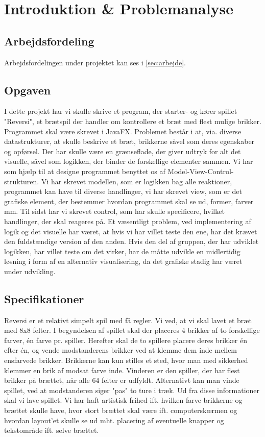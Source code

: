 \section{Introduktion \& Problemanalyse}
\subsection{Arbejdsfordeling}
Arbejdsfordelingen under projektet kan ses i \cref{sec:arbejde}.
\subsection{Opgaven}
I dette projekt har vi skulle skrive et program, der starter- og kører spillet "Reversi", et brætspil der handler om kontrollere et bræt med flest mulige brikker. Programmet skal være skrevet i JavaFX. 
Problemet består i at, via. diverse datastrukturer, at skulle beskrive et bræt, brikkerne såvel som deres egenskaber og opførsel. Der har skulle være en grænseflade, der giver udtryk for alt det visuelle, såvel som logikken, der binder de forskellige elementer sammen. 
Vi har som hjælp til at designe programmet benyttet os af Model-View-Control-strukturen. Vi har skrevet modellen, som er logikken bag alle reaktioner, programmet kan have til diverse handlinger, vi har skrevet view, som er det grafiske element, der bestemmer hvordan programmet skal se ud, former, farver mm. Til sidst har vi skrevet control, som har skulle specificere, hvilket handlinger, der skal reageres på. \newline
\newline
Et væsentligt problem, ved implementering af logik og det visuelle har været, at hvis vi har villet teste den ene, har det krævet den fuldstændige version af den anden. Hvis den del af gruppen, der har udviklet logikken, har villet teste om det virker, har de måtte udvikle en midlertidig løsning i form af en alternativ visualisering, da det grafiske stadig har været under udvikling.


\subsection{Specifikationer}
Reversi er et relativt simpelt spil med få regler. Vi ved, at vi skal lavet et bræt med 8x8 felter. I begyndelsen af spillet skal der placeres 4 brikker af to forskellige farver, én farve pr. spiller. Herefter skal de to spillere placere deres brikker én efter én, og vende modstanderens brikker ved at klemme dem inde mellem ensfarvede brikker. Brikkerne kan kun stilles et sted, hvor man med sikkerhed klemmer en brik af modsat farve inde. Vinderen er den spiller, der har flest brikker på brættet, når alle 64 felter er udfyldt. Alternativt kan man vinde spillet, ved at modstanderen siger "pas" to ture i træk.
Ud fra disse informationer skal vi lave spillet. Vi har haft artistisk frihed ift. hvilken farve brikkerne og brættet skulle have, hvor stort brættet skal være ift. computerskærmen og hvordan layout'et skulle se ud mht. placering af eventuelle knapper og tekstområde ift. selve brættet. 



